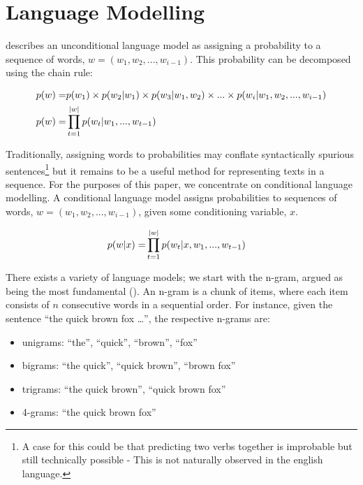 \documentclass[12pt,twoside]{report}
\begin{document}
\section{Language Modelling}


\cite{dyer_conditional_2017} describes an unconditional language model as assigning a probability to a sequence of words,  $w = (w_1, w_2, ..., w_{i-1})$. This probability can be decomposed using the chain rule:

\begin{align}
p(w) =& \space p(w_1) \times p(w_2|w_1) \times p(w_3|w_1, w_2) \times ... \times p(w_i|w_1, w_2, ..., w_{i-1}) \\
p(w) =& \prod^{|w|}_{t=1}p(w_t|w_1, ..., w_{t-1})
\end{align}

Traditionally, assigning words to probabilities may conflate syntactically spurious sentences\footnote{A case for this could be that predicting two verbs together is improbable but still technically possible - This is not naturally observed in the english language.} but it remains to be a useful method for representing texts in a sequence. For the purposes of this paper, we concentrate on conditional language modelling. A conditional language model assigns probabilities to sequences of words, $w = (w_1, w_2, ..., w_{i-1})$, given some conditioning variable, $x$. 

\begin{align}
	p(\boldmath{w}|x) = &{} \prod^{|w|}_{t=1}p(w_t|x,w_1, ..., w_{t-1})
\end{align}

There exists a variety of language models; we start with the n-gram, argued as being the most fundamental (\cite{le_recurrent_2018}). An n-gram is a chunk of items, where each item consists of $n$ consecutive words in a sequential order. For instance, given the sentence ``the quick brown fox \ldots'', the respective n-grams are: 

\begin{itemize}  
	\item unigrams: ``the'', ``quick'', ``brown'', ``fox''
	\item bigrams: ``the quick'', ``quick brown'', ``brown fox''
	\item trigrams: ``the quick brown'', ``quick brown fox''
	\item 4-grams: ``the quick brown fox''
\end{itemize}
\end{document}
